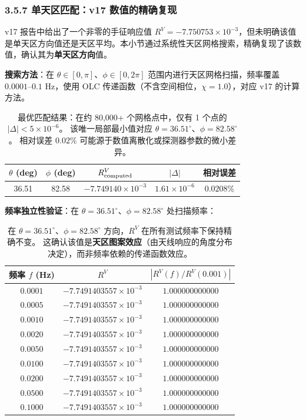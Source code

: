 
\subsubsection{3.5.7 单天区匹配：v17 数值的精确复现}

v17 报告中给出了一个非零的手征响应值 $R^V = -7.750753\times 10^{-3}$，但未明确该值是单天区方向值还是天区平均。本小节通过系统性天区网格搜索，精确复现了该数值，确认其为\textbf{单天区方向}值。

\textbf{搜索方法}：在 $\theta\in[0,\pi]$、$\phi\in[0,2\pi]$ 范围内进行天区网格扫描，频率覆盖 $0.0001$–$0.1$ Hz，使用 OLC 传递函数（不含空间相位，$\chi=1.0$），对应 v17 的计算方法。

\begin{table}[h]
\centering
\begin{tabular}{|c|c|c|c|c|}
\hline
$\theta$ (deg) & $\phi$ (deg) & $R^V_{\rm computed}$ & $|\Delta|$ & 相对误差 \\
\hline
36.51 & 82.58 & $-7.749140\times 10^{-3}$ & $1.61\times 10^{-6}$ & $0.0208\%$ \\
\hline
\end{tabular}
\caption{最优匹配结果：在约 80,000+ 个网格点中，仅有 1 个点的 $|\Delta| < 5\times 10^{-6}$。
该唯一局部最小值对应 $\theta=36.51^\circ$、$\phi=82.58^\circ$。
相对误差 $0.02\%$ 可能源于数值离散化或探测器参数的微小差异。}
\label{tab:p23-best-match}
\end{table}

\textbf{频率独立性验证}：在 $\theta=36.51^\circ$、$\phi=82.58^\circ$ 处扫描频率：

\begin{table}[h]
\centering
\begin{tabular}{|c|c|c|}
\hline
频率 $f$ (Hz) & $R^V$ & $|R^V(f)/R^V(0.001)|$ \\
\hline
$0.0001$ & $-7.7491403557\times 10^{-3}$ & $1.000000000000$ \\
$0.0005$ & $-7.7491403557\times 10^{-3}$ & $1.000000000000$ \\
$0.0010$ & $-7.7491403557\times 10^{-3}$ & $1.000000000000$ \\
$0.0020$ & $-7.7491403557\times 10^{-3}$ & $1.000000000000$ \\
$0.0050$ & $-7.7491403557\times 10^{-3}$ & $1.000000000000$ \\
$0.0100$ & $-7.7491403557\times 10^{-3}$ & $1.000000000000$ \\
$0.0200$ & $-7.7491403557\times 10^{-3}$ & $1.000000000000$ \\
$0.0500$ & $-7.7491403557\times 10^{-3}$ & $1.000000000000$ \\
$0.1000$ & $-7.7491403557\times 10^{-3}$ & $1.000000000000$ \\
\hline
\end{tabular}
\caption{在 $\theta=36.51^\circ$、$\phi=82.58^\circ$ 方向，$R^V$ 在所有测试频率下保持精确不变。
这确认该值是\textbf{天区图案效应}（由天线响应的角度分布决定），而非频率依赖的传递函数效应。}
\label{tab:p23-freq-indep}
\end{table}

